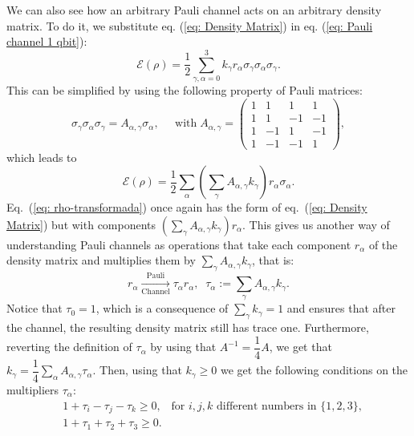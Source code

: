 \documentclass[10pt,letterpaper]{article} %
\begin{document}
We can also see how an arbitrary Pauli channel acts on an arbitrary  
density matrix.
To do it, we substitute eq. (\ref{eq: Density Matrix}) 
in eq. (\ref{eq: Pauli channel 1 qbit}):
\begin{equation}
\mathcal{E}(\rho) = \dfrac{1}{2}\sum_{\gamma,\alpha=0}^3 k_{\gamma} r_{\alpha} \sigma_{\gamma} \sigma_{\alpha} \sigma_{\gamma}.
\end{equation}
This can be simplified by using the following property of Pauli matrices:
\begin{equation}
\label{eq: propiedad-pauli}
\sigma_{\gamma} \sigma_{\alpha} \sigma_{\gamma} = A_{\alpha,\gamma} \sigma_{\alpha}, \;\;\;\;\; \text{with} \; A_{\alpha,\gamma} = \begin{pmatrix}
1 & 1 & 1 & 1\\
1 & 1 & -1 &-1 \\
1 & -1 & 1 & -1 \\
1 & -1 & -1 & 1
\end{pmatrix},
\end{equation}
which leads to
\begin{equation}
\label{eq: rho-transformada}
\mathcal{E}(\rho) = \dfrac{1}{2} \sum_{\alpha} \left(\sum_{\gamma} A_{\alpha, \gamma} k_{\gamma} \right) r_{\alpha} \sigma_{\alpha}.
\end{equation}
Eq.~(\ref{eq: rho-transformada}) once again has the form of eq.~(\ref{eq: Density Matrix})
but with components $\left( \sum_{\gamma} A_{\alpha,\gamma} k_{\gamma} \right) r_{\alpha}$.
This gives us another way of understanding Pauli channels
as operations that take each component $r_{\alpha}$
of the density matrix and multiplies them
by $\sum_{\gamma} A_{\alpha,\gamma} k_{\gamma}$, 
that is:
\begin{equation}
\label{eq: multipliers}
r_{\alpha}  \xrightarrow[\text{Channel}]{\text{Pauli}}  \tau_{\alpha} r_{\alpha} ,\;\; \tau_{\alpha} := \sum_{\gamma} A_{\alpha,\gamma} k_{\gamma}.
\end{equation}
Notice that $\tau_0 = 1$, which is a consequence of $\sum_{\gamma}k_{\gamma}=1$
and ensures that after the channel, the resulting density matrix still has trace one. 
Furthermore, reverting the definition of $\tau_{\alpha}$ by using that $A^{-1} = \dfrac{1}{4} A$, 
we get that $k_{\gamma} = \dfrac{1}{4} \sum_{\alpha} A_{\alpha,\gamma} \tau_{\alpha}$.
Then, using that $k_{\gamma} \geq 0$
we get the following conditions on the multipliers $\tau_{\alpha}$:
\begin{eqnarray}
\label{eq: conditions-tetrahedron}
&1+\tau_i -\tau_j - \tau_k \geq 0,  \;\;\; \text{for $i,j,k$ different numbers in $\{1,2,3\}$}, \\
&1+\tau_1 + \tau_2 + \tau_3 \geq 0.
\end{eqnarray}
\end{document}
